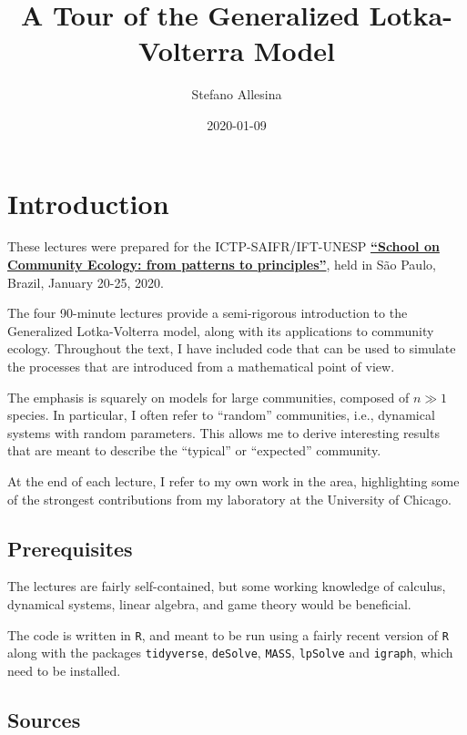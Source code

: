 \documentclass[]{book}
\title{A Tour of the Generalized Lotka-Volterra Model}
\author{Stefano Allesina}
\date{2020-01-09}
\begin{document}
\maketitle

{
\setcounter{tocdepth}{1}
\tableofcontents
}
\hypertarget{introduction}{%
\chapter{Introduction}\label{introduction}}

These lectures were prepared for the ICTP-SAIFR/IFT-UNESP \href{https://www.ictp-saifr.org/community-ecology-from-patterns-to-principles/}{\textbf{``School on Community Ecology: from patterns to principles''}}, held in São Paulo, Brazil, January 20-25, 2020.

The four 90-minute lectures provide a semi-rigorous introduction to the Generalized Lotka-Volterra model, along with its applications to community ecology. Throughout the text, I have included code that can be used to simulate the processes that are introduced from a mathematical point of view.

The emphasis is squarely on models for large communities, composed of \(n \gg 1\) species. In particular, I often refer to ``random'' communities, i.e., dynamical systems with random parameters. This allows me to derive interesting results that are meant to describe the ``typical'' or ``expected'' community.

At the end of each lecture, I refer to my own work in the area, highlighting some of the strongest contributions from my laboratory at the University of Chicago.

\hypertarget{prerequisites}{%
\section{Prerequisites}\label{prerequisites}}

The lectures are fairly self-contained, but some working knowledge of calculus, dynamical systems, linear algebra, and game theory would be beneficial.

The code is written in \texttt{R}, and meant to be run using a fairly recent version of \texttt{R} along with the packages \texttt{tidyverse}, \texttt{deSolve}, \texttt{MASS}, \texttt{lpSolve} and \texttt{igraph}, which need to be installed.

\hypertarget{sources}{%
\section{Sources}\label{sources}}
\end{document}
